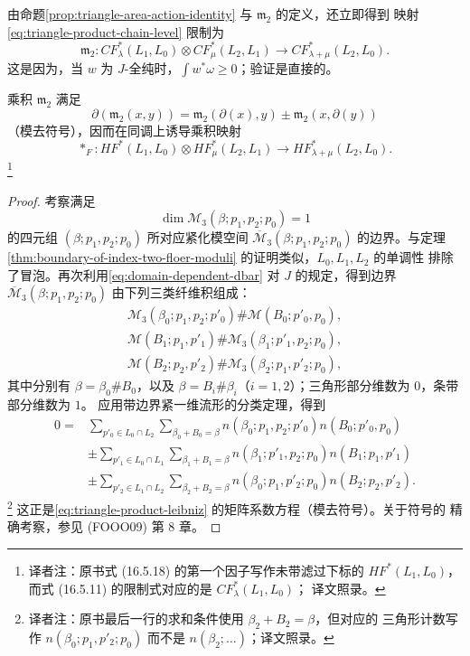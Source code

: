 由命题\ref{prop:triangle-area-action-identity} 与 $\mathfrak m_2$ 的定义，还立即得到
映射\eqref{eq:triangle-product-chain-level} 限制为
\[
 \mathfrak m_2:CF_\lambda^*(L_1,L_0)\otimes CF_\mu^*(L_2,L_1)
 \longrightarrow CF_{\lambda+\mu}^*(L_2,L_0).
\]
这是因为，当 $w$ 为 $J$-全纯时，$\int w^*\omega\geq0$；验证是直接的。

\begin{proposition}
\label{prop:triangle-product-chain-map}
乘积 $\mathfrak m_2$ 满足
\begin{equation}
 \partial(\mathfrak m_2(x,y))
 =\mathfrak m_2(\partial(x),y)\pm\mathfrak m_2(x,\partial(y))
\label{eq:triangle-product-leibniz}
\end{equation}
（模去符号），因而在同调上诱导乘积映射
\begin{equation}
 *_F:HF^*(L_1,L_0)\otimes HF_\mu^*(L_2,L_1)
 \longrightarrow HF_{\lambda+\mu}^*(L_2,L_0).
\label{eq:triangle-product-on-homology}
\end{equation}
\footnote{译者注：原书式 (16.5.18) 的第一个因子写作未带滤过下标的
$HF^*(L_1,L_0)$，而式 (16.5.11) 的限制式对应的是 $CF_\lambda^*(L_1,L_0)$；
译文照录。}
\end{proposition}

\begin{proof}
考察满足
\[
 \dim\mathcal M_3(\beta;p_1,p_2;p_0)=1
\]
的四元组 $(\beta;p_1,p_2;p_0)$ 所对应紧化模空间
$\overline{\mathcal M}_3(\beta;p_1,p_2;p_0)$ 的边界。与定理
\ref{thm:boundary-of-index-two-floer-moduli} 的证明类似，$L_0,L_1,L_2$ 的单调性
排除了冒泡。再次利用\eqref{eq:domain-dependent-dbar} 对 $J$ 的规定，得到边界
$\overline{\mathcal M}_3(\beta;p_1,p_2;p_0)$ 由下列三类纤维积组成：
\[
 \begin{gathered}
 \mathcal M_3(\beta_0;p_1,p_2;p'_0)\#\mathcal M(B_0;p'_0,p_0),\\
 \mathcal M(B_1;p_1,p'_1)\#\mathcal M_3(\beta_1;p'_1,p_2;p_0),\\
 \mathcal M(B_2;p_2,p'_2)\#\mathcal M_3(\beta_2;p_1,p'_2;p_0),
 \end{gathered}
\]
其中分别有 $\beta=\beta_0\#B_0$，以及
$\beta=B_i\#\beta_i$（$i=1,2$）；三角形部分维数为 $0$，条带部分维数为 $1$。
应用带边界紧一维流形的分类定理，得到
\[
\begin{aligned}
0={}&\sum_{p'_0\in L_0\cap L_2}\sum_{\beta_0+B_0=\beta}
n(\beta_0;p_1,p_2;p'_0)n(B_0;p'_0,p_0)\\
&\pm\sum_{p'_1\in L_0\cap L_1}\sum_{\beta_1+B_1=\beta}
n(\beta_1;p'_1,p_2;p_0)n(B_1;p_1,p'_1)\\
&\pm\sum_{p'_2\in L_1\cap L_2}\sum_{\beta_2+B_2=\beta}
n(\beta_0;p_1,p'_2;p_0)n(B_2;p_2,p'_2).
\end{aligned}
\]
\footnote{译者注：原书最后一行的求和条件使用 $\beta_2+B_2=\beta$，但对应的
三角形计数写作 $n(\beta_0;p_1,p'_2;p_0)$ 而不是 $n(\beta_2;\ldots)$；译文照录。}
这正是\eqref{eq:triangle-product-leibniz} 的矩阵系数方程（模去符号）。关于符号的
精确考察，参见 (FOOO09) 第 8 章。
\end{proof}
